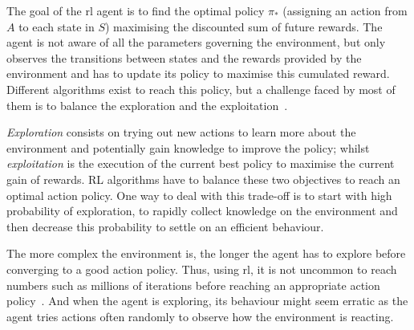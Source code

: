 	The goal of the \gls{rl} agent is to find the optimal policy $\pi_*$ (assigning an action from $A$ to each state in $S$) maximising the discounted sum of future rewards. The agent is not aware of all the parameters governing the environment, but only observes the transitions between states and the rewards provided by the environment and has to update its policy to maximise this cumulated reward. Different algorithms exist to reach this policy, but a challenge faced by most of them is to balance the exploration and the exploitation~\citep{sutton1998reinforcement}.
	
	\emph{Exploration} consists on trying out new actions to learn more about the environment and potentially gain knowledge to improve the policy; whilst \emph{exploitation} is the execution of the current best policy to maximise the current gain of rewards. RL algorithms have to balance these two objectives to reach an optimal action policy. One way to deal with this trade-off is to start with high probability of exploration, to rapidly collect knowledge on the environment and then decrease this probability to settle on an efficient behaviour.
	
	The more complex the environment is, the longer the agent has to explore before converging to a good action policy. Thus, using \gls{rl}, it is not uncommon to reach numbers such as millions of iterations before reaching an appropriate action policy~\citep{sutton1998reinforcement}. And when the agent is exploring, its behaviour might seem erratic as the agent tries actions often randomly to observe how the environment is reacting.
	
	
